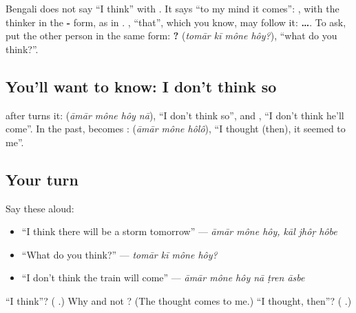 Bengali does not say \textquotedblleft{}I think\textquotedblright{} with \textbf{}. It says \textquotedblleft{}to my mind it comes\textquotedblright{}: \textbf{  }, with the thinker in the \textbf{-} form, as in \textbf{ }. \textbf{}, \textquotedblleft{}that\textquotedblright{}, which you know, may follow it: \textbf{    …}. To ask, put the other person in the same form: \textbf{   ?} (\emph{tomār kī mône hôy?}), \textquotedblleft{}what do you think?\textquotedblright{}.

\subsection*{You'll want to know: I don't think so}
\textbf{} after \textbf{} turns it: \textbf{   } (\emph{āmār mône hôy nā}), \textquotedblleft{}I don't think so\textquotedblright{}, and \textbf{     }, \textquotedblleft{}I don't think he'll come\textquotedblright{}. In the past, \textbf{} becomes \textbf{}: \textbf{  } (\emph{āmār mône hôlô}), \textquotedblleft{}I thought (then), it seemed to me\textquotedblright{}.

\subsection*{Your turn}
Say these aloud:

\begin{itemize}
\raggedright
  \item \textquotedblleft{}I think there will be a storm tomorrow\textquotedblright{} — \emph{āmār mône hôy, kāl jhôṛ hôbe}
  \item \textquotedblleft{}What do you think?\textquotedblright{} — \emph{tomār kī mône hôy?}
  \item \textquotedblleft{}I don't think the train will come\textquotedblright{} — \emph{āmār mône hôy nā ṭren āsbe}
\end{itemize}

\begin{tcolorbox}[breakable,colback=teal!4,colframe=teal!35!black,title={Before you move on}]
\textquotedblleft{}I think\textquotedblright{}? (\textbf{  }.) Why \textbf{} and not \textbf{}? (The thought comes to me.) \textquotedblleft{}I thought, then\textquotedblright{}? (\textbf{  }.)
\end{tcolorbox}
